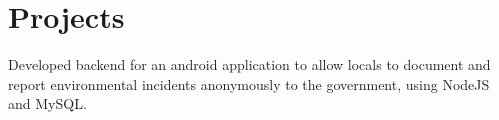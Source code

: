 \documentclass[]{deedy-resume-openfont}
\begin{document}
\begin{minipage}[t]{0.66\textwidth}







\section{Projects}
\location

\begin{tightemize}
\item Developed backend for an android application to allow locals to document and report environmental incidents anonymously to the government, using NodeJS and MySQL. 
\end{tightemize}
\sectionsep


\end{minipage}
\end{document}
